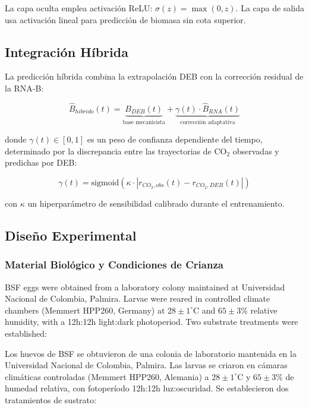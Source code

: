 \documentclass[12pt,a4paper]{article}
\begin{document}
La capa oculta emplea activaci\'{o}n ReLU: $\sigma(z) = \max(0, z)$. La capa de salida usa activaci\'{o}n lineal para predicci\'{o}n de biomasa sin cota superior.

\subsection{Integraci\'{o}n H\'{i}brida}

La predicci\'{o}n h\'{i}brida combina la extrapolaci\'{o}n DEB con la correcci\'{o}n residual de la RNA-B:

\begin{equation}
    \hat{B}_{hibrido}(t) = \underbrace{B_{DEB}(t)}_{\text{base mecanicista}} + \underbrace{\gamma(t) \cdot \hat{B}_{RNA}(t)}_{\text{correcci\'{o}n adaptativa}} \label{eq:hybrid}
\end{equation}

donde $\gamma(t) \in [0,1]$ es un peso de confianza dependiente del tiempo, determinado por la discrepancia entre las trayectorias de CO$_2$ observadas y predichas por DEB:

\begin{equation}
    \gamma(t) = \text{sigmoid}\left(\kappa \cdot |r_{CO_2,obs}(t) - r_{CO_2,DEB}(t)|\right) \label{eq:gamma}
\end{equation}

con $\kappa$ un hiperpar\'{a}metro de sensibilidad calibrado durante el entrenamiento.

\subsection{Dise\~{n}o Experimental}

\subsubsection{Material Biol\'{o}gico y Condiciones de Crianza}

BSF eggs were obtained from a laboratory colony maintained at Universidad Nacional de Colombia, Palmira. Larvae were reared in controlled climate chambers (Memmert HPP260, Germany) at $28 \pm 1^{\circ}$C and $65 \pm 3$\% relative humidity, with a 12h:12h light:dark photoperiod. Two substrate treatments were established:

Los huevos de BSF se obtuvieron de una colonia de laboratorio mantenida en la Universidad Nacional de Colombia, Palmira. Las larvas se criaron en c\'{a}maras clim\'{a}ticas controladas (Memmert HPP260, Alemania) a $28 \pm 1^{\circ}$C y $65 \pm 3$\% de humedad relativa, con fotoper\'{i}odo 12h:12h luz:oscuridad. Se establecieron dos tratamientos de sustrato:
\end{document}

